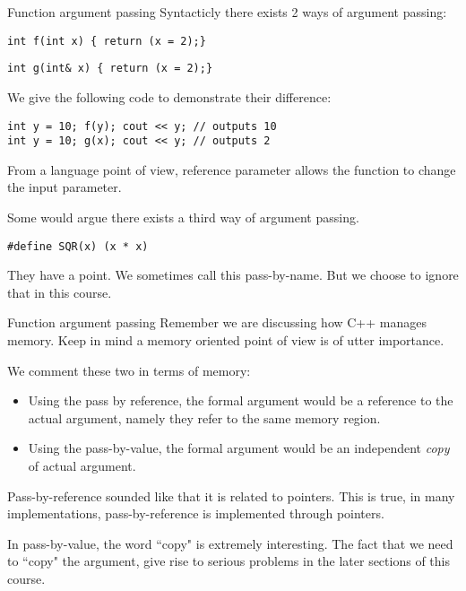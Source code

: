 \begin{frame}[fragile]{Function argument passing}
Syntacticly there exists 2 ways of argument passing:

\begin{verbatim}
int f(int x) { return (x = 2);}
\end{verbatim} 

\begin{verbatim}
int g(int& x) { return (x = 2);}
\end{verbatim} 

We give the following code to demonstrate their difference:
\begin{verbatim}
int y = 10; f(y); cout << y; // outputs 10
int y = 10; g(x); cout << y; // outputs 2
\end{verbatim}
From a language point of view, reference parameter allows the function to change the input parameter. 

Some would argue there exists a third way of argument passing. 
\begin{verbatim}
#define SQR(x) (x * x)
\end{verbatim}
They have a point. We sometimes call this pass-by-name. But we choose to ignore that in this course.

\end{frame}

\begin{frame}[fragile]{Function argument passing}
Remember we are discussing how C++ manages memory. Keep in mind a memory oriented point of view is of utter importance.

We comment these two in terms of memory:
\begin{itemize}
	\item Using the pass by reference, the formal argument would be a reference to the actual argument, namely they refer to the same memory region.  
	\item Using the pass-by-value, the formal argument would be an independent \textit{copy} of actual argument. 
\end{itemize}

Pass-by-reference sounded like that it is related to pointers. This is true, in many implementations, pass-by-reference is implemented through pointers.

In pass-by-value, the word ``copy" is extremely interesting. The fact that we need to ``copy" the argument, give rise to serious problems in the later sections of this course. 
\end{frame}

